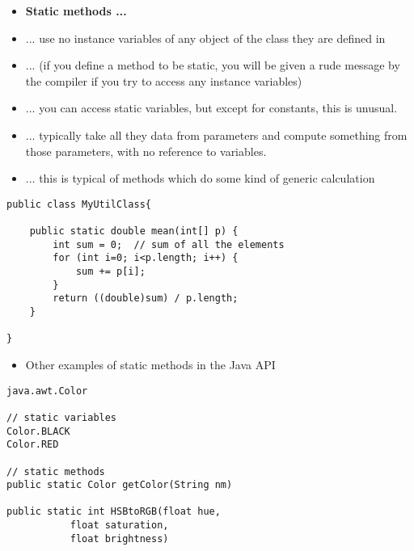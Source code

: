 \documentclass{beamer}
\begin{document}
\begin{frame}
\begin{itemize}
\item \textbf{Static methods ... }
\item ... use no instance variables of any object of the class they are defined in
\item ... (if you define a method to be static, you will be given a rude message by the compiler if you try to access any instance variables) 
\item ... you can access static variables, but except for constants, this is unusual. 
\item ... typically take all they data from parameters and compute something from those parameters, with no reference to variables. 
\item ... this is typical of methods which do some kind of generic calculation
\end{itemize} 
\end{frame} 

\begin{frame}[fragile]
\begin{block}{}
\begin{lstlisting}
public class MyUtilClass{
    
    public static double mean(int[] p) {
        int sum = 0;  // sum of all the elements
        for (int i=0; i<p.length; i++) {
            sum += p[i];
        }
        return ((double)sum) / p.length;
    }

}
\end{lstlisting}
\end{block}
\end{frame} 

\begin{frame}[fragile]
\begin{itemize}
\item Other examples of static methods in the Java API
\end{itemize} 
\begin{block}{}
\begin{lstlisting}
java.awt.Color

// static variables
Color.BLACK
Color.RED

// static methods
public static Color getColor(String nm)

public static int HSBtoRGB(float hue,
           float saturation,
           float brightness)
\end{lstlisting}
\end{block}
\end{frame} 
\end{document}
